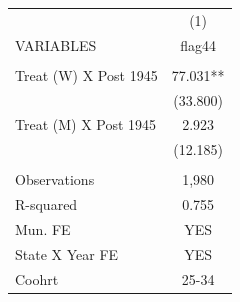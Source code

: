 \begin{tabular}{lc} \hline
 & (1) \\
VARIABLES & flag44 \\ \hline
 &  \\
Treat (W) X Post 1945 & 77.031** \\
 & (33.800) \\
Treat (M) X Post 1945 & 2.923 \\
 & (12.185) \\
 &  \\
Observations & 1,980 \\
R-squared & 0.755 \\
Mun. FE & YES \\
State X Year FE & YES \\
 Coohrt & 25-34 \\ \hline
\end{tabular}
